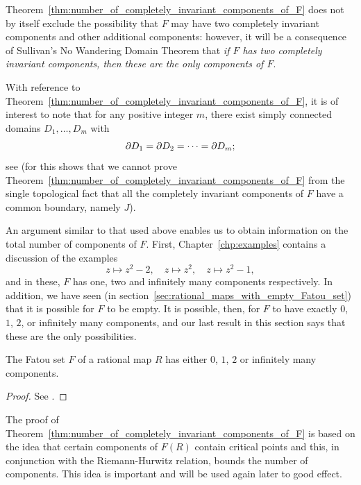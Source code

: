 Theorem~\ref{thm:number_of_completely_invariant_components_of_F} does not by
itself exclude the possibility that $F$ may have two completely invariant
components and other additional components: however, it will be a consequence of
Sullivan's No Wandering Domain Theorem that \emph{if $F$ has two completely
invariant components, then these are the only components of $F$}.

\begin{remark}[For any $m$, $\exists$ simply connected domains $D_1, \dots, D_m$ with $\boundary{D_1} =$ $\cdots =$ $\boundary{D_m}$]
    With reference to
    Theorem~\ref{thm:number_of_completely_invariant_components_of_F}, it is of
    interest to note that for any positive integer $m$, there exist simply
    connected domains $D_1, \dots, D_m$ with
    \begin{equation*}
        \partial {D_1} = \partial {D_2} = \cdots = \partial {D_m};
    \end{equation*}
    see \cite[143]{Hocking1961} (for this shows that we cannot prove
    Theorem~\ref{thm:number_of_completely_invariant_components_of_F} from the
    single topological fact that all the completely invariant components of $F$
    have a common boundary, namely $J$).
\end{remark}

An argument similar to that used above enables us to obtain information on the
total number of components of $F$. First, Chapter~\ref{chp:examples} contains a
discussion of the examples
\begin{equation*}
    z \mapsto z^2 - 2, \quad z \mapsto z^2, \quad z \mapsto z^2 -1,
\end{equation*}
and in these, $F$ has one, two and infinitely many components respectively. In
addition, we have seen (in section~\ref{sec:rational_maps_with_empty_Fatou_set})
that it is possible for $F$ to be empty. It is possible, then, for $F$ to have
exactly $0$, $1$, $2$, or infinitely many components, and our last result in
this section says that these are the only possibilities.

\begin{theorem}
    The Fatou set $F$ of a rational map $R$ has either $0$, $1$, $2$ or
    infinitely many components.
\end{theorem}
\begin{proof}
    See \cite[94]{Beardon1991}.
\end{proof}

\begin{remark}
    The proof of
    Theorem~\ref{thm:number_of_completely_invariant_components_of_F} is based on
    the idea that certain components of $F(R)$ contain critical points and this,
    in conjunction with the Riemann-Hurwitz relation, bounds the number of
    components. This idea is important and will be used again later to good
    effect.
\end{remark}

